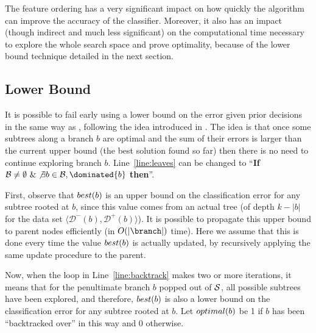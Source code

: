 \documentclass{llncs}
\def\posclass{+}
\def\negclass{-}
\def\datasymb{D}
\newcommand{\setex}[1]{\ensuremath{{\mathcal \datasymb}^{#1}}\xspace}
\newcommand{\posex}{{\setex{\posclass}}\xspace}
\newcommand{\negex}{{\setex{\negclass}}\xspace}
\newcommand{\bud}[0]{\ensuremath{{\cal B}}}
\newcommand{\sequence}[0]{\ensuremath{{\cal S}}}
\newcommand{\best}[1][]{\ensuremath{\ifthenelse{\equal{#1}{}}{{best}}{{best({#1})}}}}
\newcommand{\opt}[1][]{\ensuremath{\ifthenelse{\equal{#1}{}}{optimal}{optimal({#1})}}}
\newcommand{\abranch}[0]{\ensuremath{b}}
\newcommand{\mdepth}[0]{\ensuremath{k}}
\begin{document}
The feature ordering has a very significant impact on how quickly the algorithm can improve the accuracy of the classifier. Moreover, it also has an impact (though indirect and much less significant) on the computational time necessary to explore the whole search space and prove optimality, because of the lower bound technique detailed in the next section.


\subsection{Lower Bound}
\label{sec:lb}

It is possible to fail early using a lower bound on the error given prior decisions in the same way as \murtree, following the idea introduced in \cite{dl8}. The idea is that once some subtrees along a branch $\abranch$ are optimal and the sum of their errors is larger than the current upper bound (the best solution found so far) then there is no need to continue exploring branch $\abranch$. Line~\ref{line:leaves} can be changed to ``\textbf{If} $\bud \neq \emptyset ~\& \not\exists \abranch \in \bud, \dominated{\abranch}$ \textbf{then}''. %




First, observe that $\best[\abranch]$ is an upper bound on the classification error for any subtree rooted at $\abranch$, since this value comes from an actual tree (of depth $\mdepth - |\abranch|$ for the data set $\langle \negex(\abranch),\posex(\abranch) \rangle$). It is possible to propagate this upper bound to parent nodes efficiently (in $O(|\branch|)$ time). Here we assume that this is done every time the value $\best[\abranch]$ is actually updated, by recursively applying the same update procedure to the parent.


Now, when the loop in Line~\ref{line:backtrack} makes two or more iterations, it means that for the penultimate branch $\abranch$ popped out of \sequence, all possible subtrees have been explored, and therefore, $\best[\abranch]$ is also a lower bound on the classification error for any subtree rooted at $\abranch$. Let $\opt[\abranch]$ be 1 if $\abranch$ has been ``backtracked over'' in this way and 0 otherwise.
\end{document}
